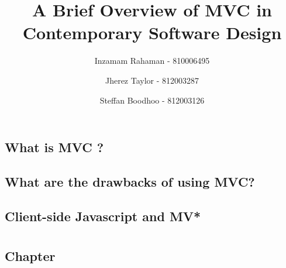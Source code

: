 \documentclass[
oneside,
openany,
12pt, a4paper,
footinclude=true,
headinclude=true,
cleardoublepage=empty
]{scrbook}
\title{A Brief Overview of MVC in Contemporary Software Design}
\author{Inzamam Rahaman - 810006495 \and Jherez Taylor - 812003287 \and Steffan Boodhoo - 812003126 }
\begin{document}
  \maketitle

  
  


  \chapter{What is MVC ?}
  

  \chapter{What are the drawbacks of using MVC?}
  

  \chapter{Client-side Javascript and MV*}
  



  \part{}
  \chapter{ Chapter}
  \lipsum[1]
\end{document}
